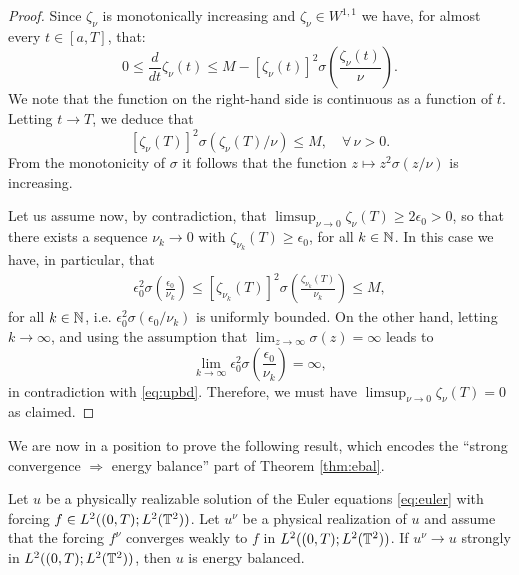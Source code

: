 \documentclass[reqno,12pt]{amsart}
\begin{document}
\begin{proof}
Since $\zeta_\nu$ is monotonically increasing and $\zeta_\nu \in W^{1,1}$ we have, for almost every $t\in [a,T]$, that:
\[
0 \le \frac{d}{dt} \zeta_\nu(t) \le M - [\zeta_\nu(t)]^2 \sigma\left(\frac{\zeta_\nu (t)}{\nu}\right).
\]
We note that the function on the right-hand side is continuous as a function of $t$. Letting $t\to T$, we deduce that
\[
[\zeta_\nu(T)]^2 \sigma(\zeta_\nu(T)/\nu) \le M, \quad \forall \, \nu > 0.
\]
From the monotonicity of $\sigma$ it follows that the function $z \mapsto z^2 \sigma(z/\nu)$  is increasing.

Let us assume now, by contradiction, that $\limsup_{\nu \to 0} \zeta_\nu(T) \ge 2\epsilon_0 > 0$, so that there exists a sequence $\nu_k \to 0$ with $\zeta_{\nu_k}(T) \ge \epsilon_0$, for all $k\in \mathbb{N}$. In this case we have, in particular, that
\begin{align}
\label{eq:upbd}
\epsilon_0^2 \sigma\left(\frac{\epsilon_0}{\nu_k}\right)
\le
[\zeta_{\nu_k}(T)]^2 \sigma\left(\frac{\zeta_{\nu_k}(T)}{\nu_k}\right)
\le M,
\end{align}
for all $k\in \mathbb{N}$, i.e. $\epsilon_0^2 \sigma(\epsilon_0/\nu_k)$ is uniformly bounded. On the other hand, letting $k \to \infty$, and using the assumption that $\lim_{z\to \infty} \sigma(z) = \infty$ leads to
\[
\lim_{k\to \infty} \epsilon_0^2 \sigma\left(\frac{\epsilon_0}{\nu_k}\right)
= \infty,
\]
in contradiction with \eqref{eq:upbd}.
 Therefore, we must have $\limsup_{\nu \to 0} \zeta_{\nu}(T) = 0$ as claimed.
\end{proof}

We are now in a position to prove the following result, which encodes the ``strong convergence $\Rightarrow$ energy balance'' part of Theorem \ref{thm:ebal}.

\begin{proposition}
    \label{prop:conv-->ebal}
Let $u$ be a physically realizable solution of the Euler equations \eqref{eq:euler}  with forcing $f\in L^2 ((0,T);L^2 (\mathbb{T}^2))$. Let $u^\nu$ be a physical realization of $u$ and assume that the forcing $f^\nu$ converges weakly to $f$ in $L^2 ((0,T);L^2 (\mathbb{T}^2))$. If $u^\nu \to u$ strongly in $L^2 ((0,T);L^2 (\mathbb{T}^2))$, then $u$ is energy balanced.
\end{proposition}
\end{document}
